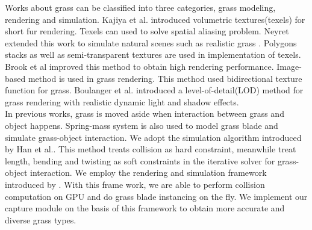 \documentclass[10pt,journal,compsoc]{IEEEtran}
\begin{document}
Works about grass can be classified into three categories, grass modeling, rendering and simulation.  Kajiya et al.\cite{kajiya1989rendering} introduced volumetric textures(texels) for short fur rendering. Texels can used to solve spatial aliasing problem. Neyret extended this work to simulate natural scenes such as realistic grass\cite{neyret1996synthesizing} \cite{neyret1998modeling}. Polygons stacks as well as semi-transparent textures are used in implementation of texels\cite{meyer1998interactive}. Brook et al\cite{bakay2002real} improved this method to obtain high rendering performance. Image-based method is used in grass rendering\cite{shah2005real}. This method used bidirectional texture function for grass. Boulanger et al.\cite{boulanger2009rendering} introduced a level-of-detail(LOD) method for grass rendering with realistic dynamic light and shadow effects.\\

In previous works, grass is moved aside when interaction between grass and object happens\cite{guerraz2003procedural}. Spring-mass system is also used to model grass blade and simulate grass-object interaction\cite{chen2010real}\cite{hempe2013generation}. We adopt the simulation algorithm introduced by Han et al.\cite{han2012real}. This method treats collision as hard constraint, meanwhile treat length, bending and twisting as soft constraints in the iterative solver for grass-object interaction. We employ the rendering and simulation framework introduced by \cite{fan2015simulation}. With this frame work, we are able to perform collision computation on GPU and do grass blade instancing on the fly.  We implement our capture module on the basis of this framework to obtain more accurate and diverse grass types.\\
\end{document}
